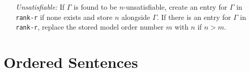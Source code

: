 \documentclass[a4paper, 11pt]{article} %
\begin{document}
\begin{enumerate}
  \item[\it Unsatisfiable:] If $\Gamma$ is found to be $n$-unsatisfiable, create an entry for $\Gamma$ in \texttt{rank-r} if none exists and store $n$ alongside $\Gamma$. If there is an entry for $\Gamma$ in \texttt{rank-r}, replace the stored model order number $m$ with $n$ if $n>m$.
\end{enumerate}



\section{Ordered Sentences}
\end{document}
